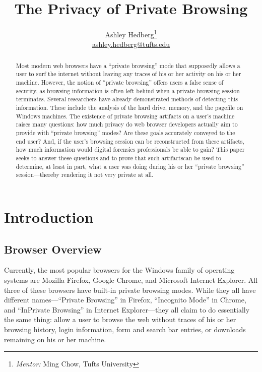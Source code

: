 \documentclass[pdftex,letterpaper,titlepage,12pt]{article}
\begin{document}
  \singlespacing
  \title{The Privacy of Private Browsing}
  \author{Ashley Hedberg\thanks{\emph{Mentor:} Ming Chow, Tufts University} \\
  \href{mailto:ashley.hedberg@tufts.edu}{ashley.hedberg@tufts.edu}}
  \date{}
  \maketitle
  
  \begin{abstract}
  Most modern web browsers have a ``private browsing'' mode that supposedly 
  allows a user to surf the internet without leaving any traces of his or her
  activity on his or her machine. However, the notion of ``private browsing'' 
  offers users a false sense of security, as browsing information is often left
  behind when a private browsing session terminates. Several researchers have 
  already demonstrated methods of detecting this information. These include the
  analysis of the hard drive, memory, and the pagefile on Windows machines.
  The existence of private browsing artifacts on a user’s machine raises many 
  questions: how much privacy do web browser developers actually aim to provide
  with ``private browsing'' modes? Are these goals accurately conveyed to the 
  end user? And, if the user’s browsing session can be reconstructed from these 
  artifacts, how much information would digital forensics professionals be 
  able to gain? This paper seeks to answer these questions and to prove that 
  such artifactscan be used to determine, at least in part, what a user was 
  doing during his or her ``private browsing'' session---thereby rendering it 
  not very private at all.
  \end{abstract}

  \section{Introduction}
    \subsection{Browser Overview}
    Currently, the most popular browsers for the Windows family of operating 
    systems are Mozilla Firefox, Google Chrome, and Microsoft Internet 
    Explorer. All three of these browsers have built-in private browsing modes.
    While they all have different names---``Private Browsing'' in Firefox,
    ``Incognito Mode'' in Chrome, and ``InPrivate Browsing'' in Internet
    Explorer---they all claim to do essentially the same thing: allow a user to
    browse the web without traces of his or her browsing history, login
    information, form and search bar entries, or downloads remaining on his or
    her machine.\cite{verdi13}\cite{google13}\cite{ie13}
\end{document}
